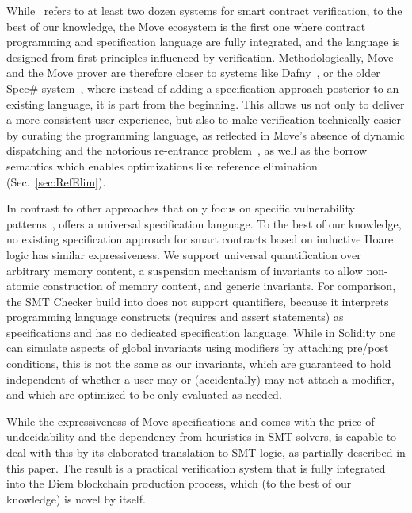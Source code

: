 While~\cite{CONTRACT_VERIFICATION} refers to at least two dozen systems for
smart contract verification, to the best of our knowledge, the Move ecosystem is
the first one where contract programming and specification language are fully
integrated, and the language is designed from first principles influenced by
verification. Methodologically, Move and the Move prover are therefore closer to
systems like Dafny~\cite{DAFNY}, or the older Spec\# system~\cite{SPECSHARP},
where instead of adding a specification approach posterior to an existing
language, it is part from the beginning. This allows us not only to deliver a
more consistent user experience, but also to make verification technically
easier by curating the programming language, as reflected in Move's absence of
dynamic dispatching and the notorious re-entrance problem~\cite{REENTRANCE}, as
well as the borrow semantics which enables optimizations like reference
elimination (Sec.~\ref{sec:RefElim}).


In contrast to other approaches that only focus on specific vulnerability
patterns~\cite{mythril,oyente,maian,securify}, \MVP offers a universal
specification language. To the best of our knowledge, no existing specification
approach for smart contracts based on inductive Hoare logic has similar
expressiveness. We support universal quantification over arbitrary memory
content, a suspension mechanism of invariants to allow non-atomic construction
of memory content, and generic invariants.  For comparison, the SMT Checker
build into \solidity \cite{solidity} does not support quantifiers, because it
interprets programming language constructs (requires and assert statements) as
specifications and has no dedicated specification language. While in Solidity
one can simulate aspects of global invariants using modifiers by attaching
pre/post conditions, this is not the same as our invariants, which are
guaranteed to hold independent of whether a user may or (accidentally) may not
attach a modifier, and which are optimized to be only evaluated as needed.

While the expressiveness of Move specifications and \MVP comes with the price of
undecidability and the dependency from heuristics in SMT solvers, \MVP is
capable to deal with this by its elaborated translation to SMT logic, as
partially described in this paper. The result is a practical verification system
that is fully integrated into the Diem blockchain production process, which (to
the best of our knowledge) is novel by itself.

